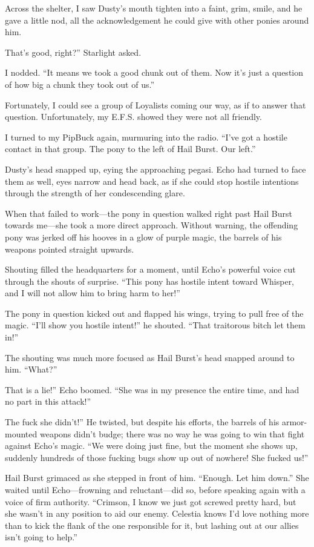 Across the shelter, I saw Dusty’s mouth tighten into a faint, grim, smile, and he gave a little nod, all the acknowledgement he could give with other ponies around him.

\leavevmode{}That’s good, right?” Starlight asked.

I nodded. “It means we took a good chunk out of them. Now it’s just a question of how big a chunk they took out of us.”

Fortunately, I could see a group of Loyalists coming our way, as if to answer that question. Unfortunately, my E.F.S. showed they were not all friendly.

I turned to my PipBuck again, murmuring into the radio. “I’ve got a hostile contact in that group. The pony to the left of Hail Burst. Our left.”

Dusty’s head snapped up, eying the approaching pegasi. Echo had turned to face them as well, eyes narrow and head back, as if she could stop hostile intentions through the strength of her condescending glare.

When that failed to work—the pony in question walked right past Hail Burst towards me—she took a more direct approach. Without warning, the offending pony was jerked off his hooves in a glow of purple magic, the barrels of his weapons pointed straight upwards.

Shouting filled the headquarters for a moment, until Echo’s powerful voice cut through the shouts of surprise. “This pony has hostile intent toward Whisper, and I will not allow him to bring harm to her!”

The pony in question kicked out and flapped his wings, trying to pull free of the magic. “I’ll show you hostile intent!” he shouted. “That traitorous bitch let them in!”

The shouting was much more focused as Hail Burst’s head snapped around to him. “What?”

\leavevmode{}That is a lie!” Echo boomed. “She was in my presence the entire time, and had no part in this attack!”

\leavevmode{}The fuck she didn’t!” He twisted, but despite his efforts, the barrels of his armor-mounted weapons didn’t budge; there was no way he was going to win that fight against Echo’s magic. “We were doing just fine, but the moment she shows up, suddenly hundreds of those fucking bugs show up out of nowhere! She fucked us!”

Hail Burst grimaced as she stepped in front of him. “Enough. Let him down.” She waited until Echo—frowning and reluctant—did so, before speaking again with a voice of firm authority. “Crimson, I know we just got screwed pretty hard, but she wasn’t in any position to aid our enemy. Celestia knows I’d love nothing more than to kick the flank of the one responsible for it, but lashing out at our allies isn’t going to help.”

